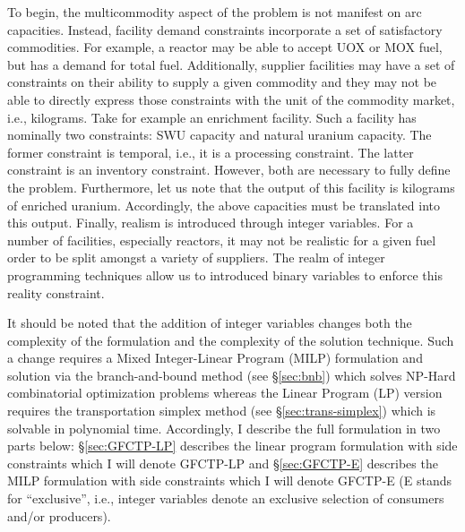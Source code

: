 To begin, the multicommodity aspect of the problem is not manifest on arc
capacities. Instead, facility demand constraints incorporate a set of
satisfactory commodities. For example, a reactor may be able to accept UOX or
MOX fuel, but has a demand for total fuel. Additionally, supplier facilities may
have a set of constraints on their ability to supply a given commodity and they
may not be able to directly express those constraints with the unit of the
commodity market, i.e., kilograms. Take for example an enrichment facility. Such
a facility has nominally two constraints: SWU capacity and natural uranium
capacity. The former constraint is temporal, i.e., it is a processing
constraint. The latter constraint is an inventory constraint. However, both are
necessary to fully define the problem. Furthermore, let us note that the output
of this facility is kilograms of enriched uranium. Accordingly, the above
capacities must be translated into this output. Finally, realism is introduced
through integer variables. For a number of facilities, especially reactors, it
may not be realistic for a given fuel order to be split amongst a variety of
suppliers. The realm of integer programming techniques allow us to introduced
binary variables to enforce this reality constraint.

It should be noted that the addition of integer variables changes both the
complexity of the formulation and the complexity of the solution technique. Such
a change requires a Mixed Integer-Linear Program (MILP) formulation and solution
via the branch-and-bound method (see \S\ref{sec:bnb}) which solves NP-Hard
combinatorial optimization problems whereas the Linear Program (LP) version
requires the transportation simplex method (see \S\ref{sec:trans-simplex})
which is solvable in polynomial time.  Accordingly, I describe the full
formulation in two parts below: \S\ref{sec:GFCTP-LP} describes the linear
program formulation with side constraints which I will denote GFCTP-LP
and \S\ref{sec:GFCTP-E} describes the MILP formulation with side constraints
which I will denote GFCTP-E (E stands for ``exclusive'', i.e., integer variables
denote an exclusive selection of consumers and/or producers).
